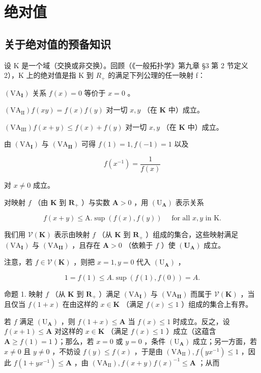 \section{绝对值}

\subsection{关于绝对值的预备知识}

设 K 是一个域（交换或非交换）。回顾（《一般拓扑学》第九章 §3 第 2 节定义 2），K 上的绝对值是指 K 到 \(R_{+}\) 的满足下列公理的任一映射 f：

\((\mathrm{VA}_{\mathbf{I}})\) 关系 \(f(x) = 0\) 等价于 \(x = 0\) 。

\((\mathrm{VA}_{\mathrm{II}}) f(xy) = f(x)f(y)\) 对一切 \(x, y\) （在 \(\mathbf{K}\) 中）成立。

\((\mathrm{VA}_{\mathrm{III}}) f(x + y) \leqslant f(x) + f(y)\) 对一切 \(x, y\) （在 \(\mathbf{K}\) 中）成立。

由 \((\mathrm{VA}_{\mathbf{I}})\) 与 \((\mathrm{VA}_{\mathbf{II}})\) 可得 \(f(1) = 1, f(-1) = 1\) 以及

\[
f (x ^ {- 1}) = \frac {1}{f (x)}
\]

对 \(x \neq 0\) 成立。

对映射 \(f\) （由 \(\mathbf{K}\) 到 \(\mathbf{R}_{+}\) ）与实数 \(\mathbf{A} > 0\) ，用 \((\mathrm{U}_{\mathbf{A}})\) 表示关系

\[
f (x + y) \leqslant \mathrm{A}. \sup (f (x), f (y)) \quad \text {   for   all   } x, y \text {   in   } \mathrm{K}.
\]

我们用 \(\mathcal{V}(\mathbf{K})\) 表示由映射 \(f\) （从 \(\mathbf{K}\) 到 \(\mathbf{R}_{+}\) ）组成的集合，这些映射满足 \((\mathrm{VA}_{\mathbf{I}})\) 与 \((\mathrm{VA}_{\mathbf{II}})\) ，且存在 \(\mathbf{A} > 0\) （依赖于 \(f\) ）使 \((\mathbf{U}_{\mathbf{A}})\) 成立。

注意，若 \(f \in \mathcal{V}(\mathbf{K})\) ，则把 \(x = 1, y = 0\) 代入 \((\mathrm{U}_{\mathbf{A}})\) ，

\[
1 = f (1) \leqslant A. \sup (f (1), f (0)) = A.
\]

命题 1. 映射 \(f\) （从 \(\mathbf{K}\) 到 \(\mathbf{R}_+\) ）满足 \((\mathrm{VA}_{\mathbf{I}})\) 与 \((\mathrm{VA}_{\mathbf{II}})\) 而属于 \(\mathcal{V}(\mathbf{K})\) ，当且仅当 \(f(1 + x)\) 在由这样的 \(x \in \mathbf{K}\) （满足 \(f(x) \leqslant 1\) ）组成的集合上有界。

若 \(f\) 满足 \((\mathrm{U}_{\mathbf{A}})\) ，则 \(f(1 + x) \leqslant \mathbf{A}\) 当 \(f(x) \leqslant 1\) 时成立。反之，设 \(f(x + 1) \leqslant \mathbf{A}\) 对这样的 \(x \in \mathbf{K}\) （满足 \(f(x) \leqslant 1\) ）成立（这蕴含 \(\mathbf{A} \geqslant f(1) = 1\) ）；那么，若 \(x = 0\) 或 \(y = 0\) ，条件 \((\mathrm{U}_{\mathbf{A}})\) 成立；另一方面，若 \(x \neq 0\) 且 \(y \neq 0\) ，不妨设 \(f(y) \leqslant f(x)\) ，于是由 \((\mathrm{VA}_{\mathrm{II}}), f(yx^{-1}) \leqslant 1\) ，因此 \(f(1 + yx^{-1}) \leqslant \mathbf{A}\) ，由 \((\mathrm{VA}_{\mathrm{II}}), f(x + y)f(x)^{-1} \leqslant \mathbf{A}\) ；从而

